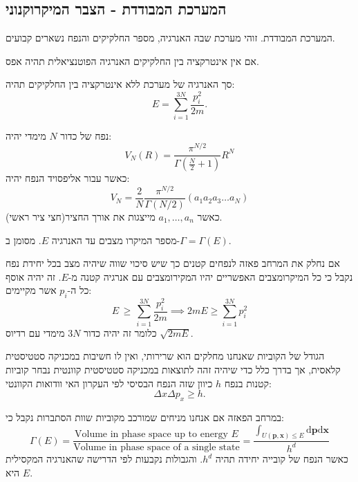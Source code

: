 \documentclass{tstextbook}
\begin{document}
\subsection{המערכת המבודדת - הצבר המיקרוקנוני}

\begin{definition}
המערכת המבודדת. זוהי מערכת שבה האנרגיה, מספר החלקיקים והנפח נשארים קבועים.

\end{definition}
\begin{proposition}
אם אין אינטרקציה בין החלקיקים האנרגיה הפוטנציאלית תהיה אפס.

\end{proposition}
\begin{corollary}
סך האנרגיה של מערכת ללא אינטרקציה בין החלקיקים תהיה:
$$E=\sum_{i=1}^{3N}\frac{p_{i}^{2}}{2m}.$$

\end{corollary}
\begin{reminder}
נפח של כדור \(N\) מימדי יהיה:
$$V_{N}(R)=\frac{\pi^{N/2}}{\Gamma\left(\frac{N}{2}+1\right)}R^{N}$$
כאשר עבור אליפסויד הנפח יהיה:
$$V_{N}=\frac{2}{N}\frac{\pi^{N/2}}{\Gamma(N/2)}(a_{1}a_{2}a_{3}\ldots a_{N})$$
כאשר \(a_{1},\dots,a_{n}\) מייצגות את אורך החציר(חצי ציר ראשי).

\end{reminder}
\begin{definition}
מספר המיקרו מצבים עד האנרגיה \(E\). מסומן ב-\(\Gamma=\Gamma(E)\).

\end{definition}
\begin{proposition}
אם נחלק את המרחב פאזה לנפחים קטנים כך שיש סיכוי שווה שיהיה מצב בכל יחידת נפח נקבל כי כל המיקרומצבים האפשריים יהיו המקירומצבים עם אנרגיה קטנה מ-\(E\). זה יהיה אוסף כל ה-\(p_{i}\) אשר מקיימים:
$$E\,\geq\,\sum_{i=1}^{3N}\frac{p_{i}^{2}}{2m}\implies 2mE \geq \sum_{i=1}^{3N} p_{i}^{2}$$
כלומר זה יהיה כדור \(3N\) מימדי עם רדיוס \(\sqrt{ 2mE }\).

\end{proposition}
\begin{remark}
הגודל של הקוביות שאנחנו מחלקים הוא שרירותי, ואין לו חשיבות במכניקה סטטיסטית קלאסית, אך בדרך כלל כדי שיהיה זהה לתוצאות במכניקה סטטיסטית קוונטית נבחר קוביות קטנות בנפח \(h\) כיוון שזה הנפח הבסיסי לפי העקרון האי וודואות הקוונטי:
$$\Delta x\Delta p_{x}\geq h.$$

\end{remark}
\begin{proposition}
במרחב הפאזה אם אנחנו מניחים שמורכב מקוביות שוות הסתברות נקבל כי:
$$\Gamma\left(E\right)={\frac{\text{Volume in phase space up to energy }E}{\text{Volume in phase space of a single state}}}=\frac{\int_{U\left( \mathbf{p},\mathbf{x} \right)\leq E}\mathrm{d}\mathbf{p}\mathrm{d}\mathbf{x}}{h^{d}} $$
כאשר הנפח של קובייה יחידה תהיה \(h^{d}\). והגבולות נקבעות לפי הדרישה שהאנרגיה המקסילית היא \(E\).

\end{proposition}
\end{document}
